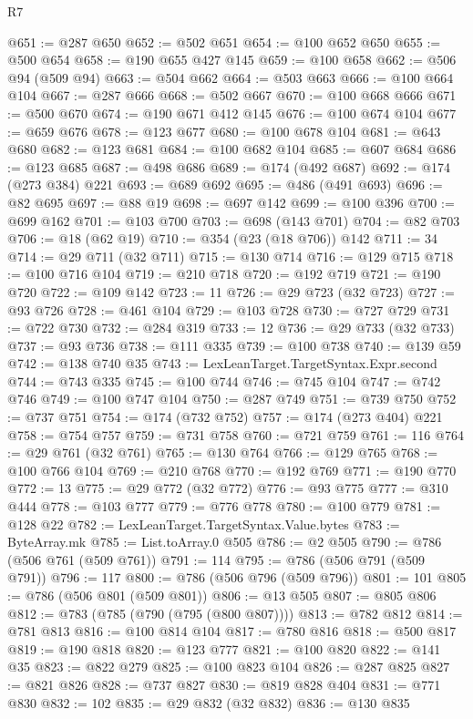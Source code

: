 \begin{lexlean}{R7}
\begin{coremodule}
@651 := @287 @650
@652 := @502 @651
@654 := @100 @652 @650
@655 := @500 @654
@658 := @190 @655 @427 @145
@659 := @100 @658
@662 := @506 @94 (@509 @94)
@663 := @504 @662
@664 := @503 @663
@666 := @100 @664 @104
@667 := @287 @666
@668 := @502 @667
@670 := @100 @668 @666
@671 := @500 @670
@674 := @190 @671 @412 @145
@676 := @100 @674 @104
@677 := @659 @676
@678 := @123 @677
@680 := @100 @678 @104
@681 := @643 @680
@682 := @123 @681
@684 := @100 @682 @104
@685 := @607 @684
@686 := @123 @685
@687 := @498 @686
@689 := @174 (@492 @687)
@692 := @174 (@273 @384) @221
@693 := @689 @692
@695 := @486 (@491 @693)
@696 := @82 @695
@697 := @88 @19
@698 := @697 @142
@699 := @100 @396
@700 := @699 @162
@701 := @103 @700
@703 := @698 (@143 @701)
@704 := @82 @703
@706 := @18 (@62 @19)
@710 := @354 (@23 (@18 @706)) @142
@711 := 34
@714 := @29 @711 (@32 @711)
@715 := @130 @714
@716 := @129 @715
@718 := @100 @716 @104
@719 := @210 @718
@720 := @192 @719
@721 := @190 @720
@722 := @109 @142
@723 := 11
@726 := @29 @723 (@32 @723)
@727 := @93 @726
@728 := @461 @104
@729 := @103 @728
@730 := @727 @729
@731 := @722 @730
@732 := @284 @319
@733 := 12
@736 := @29 @733 (@32 @733)
@737 := @93 @736
@738 := @111 @335
@739 := @100 @738
@740 := @139 @59
@742 := @138 @740 @35
@743 := LexLeanTarget.TargetSyntax.Expr.second
@744 := @743 @335
@745 := @100 @744
@746 := @745 @104
@747 := @742 @746
@749 := @100 @747 @104
@750 := @287 @749
@751 := @739 @750
@752 := @737 @751
@754 := @174 (@732 @752)
@757 := @174 (@273 @404) @221
@758 := @754 @757
@759 := @731 @758
@760 := @721 @759
@761 := 116
@764 := @29 @761 (@32 @761)
@765 := @130 @764
@766 := @129 @765
@768 := @100 @766 @104
@769 := @210 @768
@770 := @192 @769
@771 := @190 @770
@772 := 13
@775 := @29 @772 (@32 @772)
@776 := @93 @775
@777 := @310 @444
@778 := @103 @777
@779 := @776 @778
@780 := @100 @779
@781 := @128 @22
@782 := LexLeanTarget.TargetSyntax.Value.bytes
@783 := ByteArray.mk
@785 := List.toArray.{0} @505
@786 := @2 @505
@790 := @786 (@506 @761 (@509 @761))
@791 := 114
@795 := @786 (@506 @791 (@509 @791))
@796 := 117
@800 := @786 (@506 @796 (@509 @796))
@801 := 101
@805 := @786 (@506 @801 (@509 @801))
@806 := @13 @505
@807 := @805 @806
@812 := @783 (@785 (@790 (@795 (@800 @807))))
@813 := @782 @812
@814 := @781 @813
@816 := @100 @814 @104
@817 := @780 @816
@818 := @500 @817
@819 := @190 @818
@820 := @123 @777
@821 := @100 @820
@822 := @141 @35
@823 := @822 @279
@825 := @100 @823 @104
@826 := @287 @825
@827 := @821 @826
@828 := @737 @827
@830 := @819 @828 @404
@831 := @771 @830
@832 := 102
@835 := @29 @832 (@32 @832)
@836 := @130 @835

\end{coremodule}
\end{lexlean}
